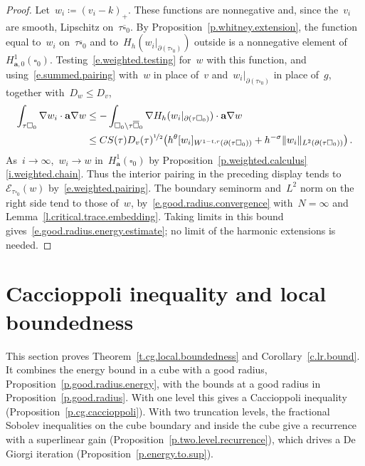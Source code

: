 \documentclass[11pt,letterpaper]{article}
\numberwithin{equation}{section}
\theoremstyle{definition}
\renewcommand{\a}{\mathbf{a}}
\newcommand{\nf}{\nicefrac}
\newcommand{\cu}{\square}
\DeclarePairedDelimiter{\norm}{\lVert}{\rVert}
\newcommand{\Ener}{\mathcal E}
\newcommand{\Hzero}[1]{H^1_{#1,0}}
\begin{document}
\begin{proof}
Let~$w_i\coloneqq(v_i-k)_+$. These functions are nonnegative and, since the~$v_i$ are smooth, Lipschitz on~$\tau\overline{\cu}_0$. By Proposition~\ref{p.whitney.extension}, the function equal to~$w_i$ on~$\tau\overline{\cu}_0$ and to~$H_h(w_i|_{\partial(\tau\cu_0)})$ outside is a nonnegative element of~$\Hzero{\a}(\cu_0)$. Testing~\eqref{e.weighted.testing} for~$w$ with this function, and using~\eqref{e.summed.pairing} with~$w$ in place of~$v$ and~$w_i|_{\partial(\tau\cu_0)}$ in place of~$g$, together with~$D_w\leq D_v$,
\begin{align*}
	\int_{\tau\cu_0}\nabla w_i\cdot\a\nabla w&\leq-\int_{\cu_0\setminus\tau\overline{\cu}_0}\nabla H_h(w_i|_{\partial(\tau\cu_0)})\cdot\a\nabla w\\
	&\leq C S(\tau)D_v(\tau)^{\nf12}\bigl(h^\theta[w_i]_{W^{1-t,r}(\partial(\tau\cu_0))}+h^{-\sigma}\norm{w_i}_{L^2(\partial(\tau\cu_0))}\bigr)\,.
\end{align*}
As~$i\to\infty$,~$w_i\to w$ in~$H^1_\a(\cu_0)$ by Proposition~\ref{p.weighted.calculus}\ref{i.weighted.chain}. Thus the interior pairing in the preceding display tends to~$\Ener_{\tau\cu_0}(w)$ by~\eqref{e.weighted.pairing}. The boundary seminorm and~$L^2$ norm on the right side tend to those of~$w$, by~\eqref{e.good.radius.convergence} with~$N=\infty$ and Lemma~\ref{l.critical.trace.embedding}. Taking limits in this bound gives~\eqref{e.good.radius.energy.estimate}; no limit of the harmonic extensions is needed.
\end{proof}

\section{Caccioppoli inequality and local boundedness}
\label{s.local.boundedness}

This section proves Theorem~\ref{t.cg.local.boundedness} and Corollary~\ref{c.lr.bound}. It combines the energy bound in a cube with a good radius, Proposition~\ref{p.good.radius.energy}, with the bounds at a good radius in Proposition~\ref{p.good.radius}. With one level this gives a Caccioppoli inequality (Proposition~\ref{p.cg.caccioppoli}). With two truncation levels, the fractional Sobolev inequalities on the cube boundary and inside the cube give a recurrence with a superlinear gain (Proposition~\ref{p.two.level.recurrence}), which drives a De Giorgi iteration (Proposition~\ref{p.energy.to.sup}).

\smallskip
\end{document}
